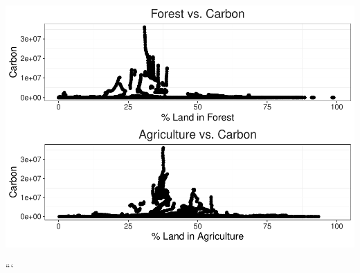 \documentclass[12pt,]{article}
\begin{document}
\includegraphics{Marx_ENV872_Project_files/figure-latex/unnamed-chunk-7-2.pdf}

```
\end{document}
